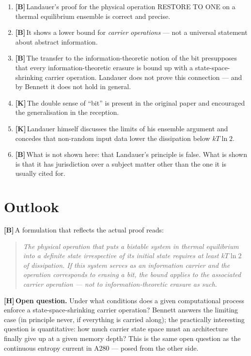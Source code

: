\documentclass[11pt,a4paper]{article}
\newcommand{\LK}{\textcolor{layK}{\textbf{\footnotesize\textsf{[K]}}}\,}
\newcommand{\LB}{\textcolor{layB}{\textbf{\footnotesize\textsf{[B]}}}\,}
\newcommand{\LH}{\textcolor{layH}{\textbf{\footnotesize\textsf{[H]}}}\,}
\theoremstyle{ffgft}
\begin{document}
\begin{enumerate}[leftmargin=1.6em,itemsep=0.35em]
  \item \LB Landauer's proof for the physical operation \textup{RESTORE TO ONE} on
        a thermal equilibrium ensemble is correct and precise.
  \item \LB It shows a lower bound for \emph{carrier operations} --- not a
        universal statement about abstract information.
  \item \LB The transfer to the information-theoretic notion of the bit
        presupposes that every information-theoretic erasure is bound up with a
        state-space-shrinking carrier operation. Landauer does not prove this
        connection --- and by Bennett it does not hold in general.
  \item \LK The double sense of “bit” is present in the original paper and
        encouraged the generalisation in the reception.
  \item \LK Landauer himself discusses the limits of his ensemble argument and
        concedes that non-random input data lower the dissipation below
        $kT\ln 2$.
  \item \LB What is not shown here: that Landauer's principle is false. What is
        shown is that it has jurisdiction over a subject matter other than the one
        it is usually cited for.
\end{enumerate}

\section{Outlook}

\LB A formulation that reflects the actual proof reads:

\begin{quote}
\emph{The physical operation that puts a bistable system in thermal equilibrium
into a definite state irrespective of its initial state requires at least
$kT\ln 2$ of dissipation. If this system serves as an information carrier and the
operation corresponds to erasing a bit, the bound applies to the associated
carrier operation --- not to information-theoretic erasure as such.}
\end{quote}

\LH \textbf{Open question.} Under what conditions does a given computational
process enforce a state-space-shrinking carrier operation? Bennett answers the
limiting case (in principle never, if everything is carried along); the
practically interesting question is quantitative: how much carrier state space
must an architecture finally give up at a given memory depth? This is the same
open question as the continuous entropy current in A280 --- posed from the other
side.
\end{document}

